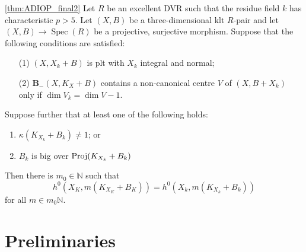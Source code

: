 \documentclass[a4paper,12pt]{book}
\DeclareMathOperator{\Spec}{Spec}
\begin{document}
	\begin{theorem}\label{Main_Abund2}\autoref{thm:ADIOP_final2}
		Let $R$ be an excellent DVR such that the residue field $k$ has characteristic $p>5$.
		Let $(X,B)$ be a three-dimensional klt $R$-pair and let $(X,B)\to \Spec(R)$ be a projective, surjective morphism.  Suppose that the following conditions are satisfied:
		
		\begin{enumerate}
		\item[(1)] $(X,X_{k}+B)$ is plt with $X_k$ integral and normal;
		\item[(2)] ${\mathbf{B}_{-}(X, K_{X}+B)}$ contains a non-canonical centre $V$ of $(X,B+X_{k})$ only if $\dim V_{k}=\dim V -1$.
		\end{enumerate}
		
		Suppose further that at least one of the following holds:
		\begin{enumerate}
			\item $\kappa(K_{X_{k}}+B_{k}) \neq 1$; or
			\item $B_{k}$ is big over $\textup{Proj}(K_{X_{k}}+B_{k})$
		\end{enumerate}	
		Then there is $m_{0} \in \mathbb{N}$ such that 
		$$h^{0}(X_{K},m(K_{X_{K}}+B_{K}))=h^{0}(X_{k},m(K_{X_{k}}+B_{k}))$$
		for all $m \in m_{0}\mathbb{N}$.
		
	\end{theorem}

	\section{Preliminaries}
	
\end{document}
